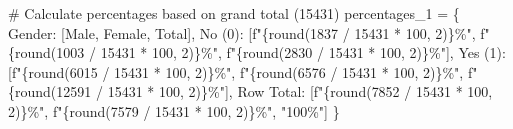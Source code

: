\documentclass[
  letterpaper,
  DIV=11,
  numbers=noendperiod]{scrreprt}
\newenvironment{Shaded}{\begin{snugshade}}{\end{snugshade}}
\newcommand{\BuiltInTok}[1]{\textcolor[rgb]{0.00,0.23,0.31}{#1}}
\newcommand{\CommentTok}[1]{\textcolor[rgb]{0.37,0.37,0.37}{#1}}
\newcommand{\DecValTok}[1]{\textcolor[rgb]{0.68,0.00,0.00}{#1}}
\newcommand{\NormalTok}[1]{\textcolor[rgb]{0.00,0.23,0.31}{#1}}
\newcommand{\OperatorTok}[1]{\textcolor[rgb]{0.37,0.37,0.37}{#1}}
\newcommand{\SpecialCharTok}[1]{\textcolor[rgb]{0.37,0.37,0.37}{#1}}
\newcommand{\SpecialStringTok}[1]{\textcolor[rgb]{0.13,0.47,0.30}{#1}}
\newcommand{\StringTok}[1]{\textcolor[rgb]{0.13,0.47,0.30}{#1}}
\begin{document}
\begin{tcolorbox}
\begin{Shaded}
\begin{Highlighting}[]
\CommentTok{\# Calculate percentages based on grand total (15431)}
\NormalTok{percentages\_1 }\OperatorTok{=}\NormalTok{ \{}
    \StringTok{\textquotesingle{}Gender\textquotesingle{}}\NormalTok{: [}\StringTok{\textquotesingle{}Male\textquotesingle{}}\NormalTok{, }\StringTok{\textquotesingle{}Female\textquotesingle{}}\NormalTok{, }\StringTok{\textquotesingle{}Total\textquotesingle{}}\NormalTok{],}
    \StringTok{\textquotesingle{}No (0)\textquotesingle{}}\NormalTok{: [}\SpecialStringTok{f"}\SpecialCharTok{\{}\BuiltInTok{round}\NormalTok{(}\DecValTok{1837} \OperatorTok{/} \DecValTok{15431} \OperatorTok{*} \DecValTok{100}\NormalTok{, }\DecValTok{2}\NormalTok{)}\SpecialCharTok{\}}\SpecialStringTok{\%"}\NormalTok{, }\SpecialStringTok{f"}\SpecialCharTok{\{}\BuiltInTok{round}\NormalTok{(}\DecValTok{1003} \OperatorTok{/} \DecValTok{15431} \OperatorTok{*} \DecValTok{100}\NormalTok{, }\DecValTok{2}\NormalTok{)}\SpecialCharTok{\}}\SpecialStringTok{\%"}\NormalTok{, }\SpecialStringTok{f"}\SpecialCharTok{\{}\BuiltInTok{round}\NormalTok{(}\DecValTok{2830} \OperatorTok{/} \DecValTok{15431} \OperatorTok{*} \DecValTok{100}\NormalTok{, }\DecValTok{2}\NormalTok{)}\SpecialCharTok{\}}\SpecialStringTok{\%"}\NormalTok{],}
    \StringTok{\textquotesingle{}Yes (1)\textquotesingle{}}\NormalTok{: [}\SpecialStringTok{f"}\SpecialCharTok{\{}\BuiltInTok{round}\NormalTok{(}\DecValTok{6015} \OperatorTok{/} \DecValTok{15431} \OperatorTok{*} \DecValTok{100}\NormalTok{, }\DecValTok{2}\NormalTok{)}\SpecialCharTok{\}}\SpecialStringTok{\%"}\NormalTok{, }\SpecialStringTok{f"}\SpecialCharTok{\{}\BuiltInTok{round}\NormalTok{(}\DecValTok{6576} \OperatorTok{/} \DecValTok{15431} \OperatorTok{*} \DecValTok{100}\NormalTok{, }\DecValTok{2}\NormalTok{)}\SpecialCharTok{\}}\SpecialStringTok{\%"}\NormalTok{, }\SpecialStringTok{f"}\SpecialCharTok{\{}\BuiltInTok{round}\NormalTok{(}\DecValTok{12591} \OperatorTok{/} \DecValTok{15431} \OperatorTok{*} \DecValTok{100}\NormalTok{, }\DecValTok{2}\NormalTok{)}\SpecialCharTok{\}}\SpecialStringTok{\%"}\NormalTok{],}
    \StringTok{\textquotesingle{}Row Total\textquotesingle{}}\NormalTok{: [}\SpecialStringTok{f"}\SpecialCharTok{\{}\BuiltInTok{round}\NormalTok{(}\DecValTok{7852} \OperatorTok{/} \DecValTok{15431} \OperatorTok{*} \DecValTok{100}\NormalTok{, }\DecValTok{2}\NormalTok{)}\SpecialCharTok{\}}\SpecialStringTok{\%"}\NormalTok{, }\SpecialStringTok{f"}\SpecialCharTok{\{}\BuiltInTok{round}\NormalTok{(}\DecValTok{7579} \OperatorTok{/} \DecValTok{15431} \OperatorTok{*} \DecValTok{100}\NormalTok{, }\DecValTok{2}\NormalTok{)}\SpecialCharTok{\}}\SpecialStringTok{\%"}\NormalTok{, }\StringTok{"100\%"}\NormalTok{]}
\NormalTok{\}}


\end{Highlighting}
\end{Shaded}
\end{tcolorbox}
\end{document}
